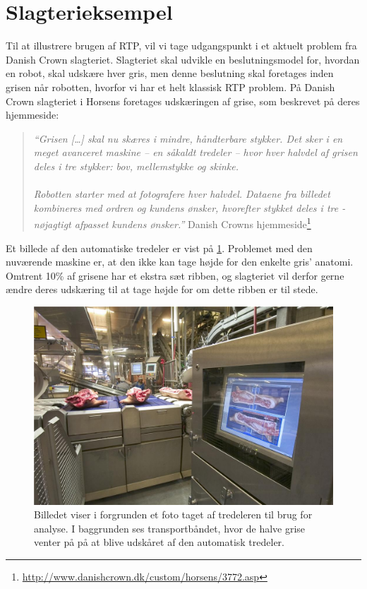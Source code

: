 \section{Slagterieksempel}
Til at illustrere brugen af RTP, vil vi tage udgangspunkt i et aktuelt problem fra Danish Crown slagteriet. Slagteriet skal udvikle en beslutningsmodel for, hvordan en robot, skal udskære hver gris, men denne beslutning skal foretages inden grisen når robotten, hvorfor vi har et helt klassisk RTP problem. På Danish Crown slagteriet i Horsens foretages udskæringen af grise, som beskrevet på deres hjemmeside:

\begin{quote}\textit{``Grisen [\ldots] skal nu skæres i mindre, håndterbare stykker. Det sker i en meget avanceret maskine -- en såkaldt tredeler -- hvor hver halvdel af grisen deles i tre stykker: bov, mellemstykke og skinke. \\ 
\\
Robotten starter med at fotografere hver halvdel. Dataene fra billedet kombineres med ordren og kundens ønsker, hvorefter stykket deles i tre - nøjagtigt afpasset kundens ønsker.''}{ Danish Crowns hjemmeside\footnote{\url{http://www.danishcrown.dk/custom/horsens/3772.asp}}}\end{quote}

Et billede af den automatiske tredeler er vist  på \cref{fig:pig}. Problemet med den nuværende maskine er, at den ikke kan tage højde for den enkelte gris' anatomi. Omtrent 10\% af grisene har et ekstra sæt ribben, og slagteriet vil derfor gerne ændre deres udskæring til at tage højde for om dette ribben er til stede. 

\begin{figure}
 \begin{center}
  \includegraphics[scale=0.5]{images/209690-1}
	\caption{Billedet viser i forgrunden  et foto taget af tredeleren til brug for analyse. I baggrunden ses transportbåndet, hvor de halve  grise venter på på at blive udskåret af den automatisk tredeler.}
	\label{fig:pig}
\end{center}
\end{figure}


